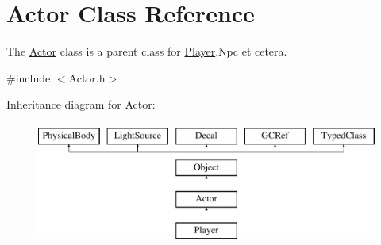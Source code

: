 \hypertarget{classActor}{}\section{Actor Class Reference}
\label{classActor}


The \hyperlink{classActor}{Actor} class is a parent class for \hyperlink{classPlayer}{Player},Npc et cetera.  




{\ttfamily \#include $<$Actor.\+h$>$}

Inheritance diagram for Actor\+:\begin{figure}[H]
\begin{center}
\leavevmode
\includegraphics[height=4.000000cm]{classActor}
\end{center}
\end{figure}

